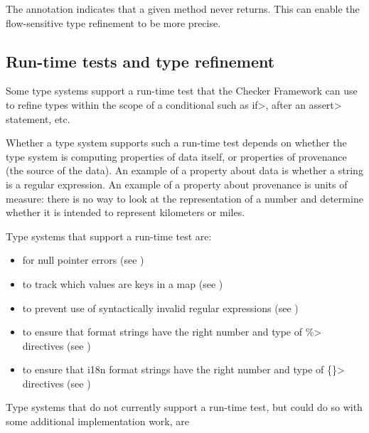 The  annotation
indicates that a given method never returns.  This can enable the
flow-sensitive type refinement to be more precise.


\subsection{Run-time tests and type refinement\label{type-refinement-runtime-tests}}

Some type systems support a run-time test that the Checker Framework can
use to refine types within the scope of a conditional such as \<if>, after
an \<assert> statement, etc.

Whether a type system supports such a run-time test depends on whether the
type system is computing properties of data itself, or properties of
provenance (the source of the data).  An example of a property about data is
whether a string is a regular expression.  An example of a property about
provenance is units of measure:  there is no way to look at the
representation of a number and determine whether it is intended to
represent kilometers or miles.


Type systems that support a run-time test are:
\begin{itemize}
\item
   for null pointer errors
  (see )
\item
   to track which values are
  keys in a map (see )
\item
   to prevent use of syntactically
  invalid regular expressions (see )
\item
   to ensure that format
  strings have the right number and type of \<\%> directives (see
  )
\item
  to ensure that i18n format strings have the right number and type of
  \<\{\}> directives (see )
\end{itemize}


Type systems that do not currently support a run-time test, but could do so with some
additional implementation work, are

